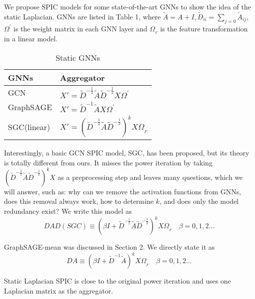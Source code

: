 \documentclass[preprint,11pt]{elsarticle}
\begin{document}
We propose SPIC models for some state-of-the-art GNNs to show the idea of the static Laplacian. GNNs are listed in Table 1, where $\widetilde{A}=A+I, \widetilde{D}_{ii}= \sum_{j=0}\widetilde{A}_{ij}$, $\Omega^{'}$ is the weight matrix in each GNN layer and $\Omega_{_F}$ is the feature transformation in a linear model.
\begin{table}
 \setlength{\abovecaptionskip}{0pt}
\setlength{\belowcaptionskip}{6pt}
  \caption{Static GNNs}
  \label{table-1}
  \centering
  \begin{tabular}{ll}
    \toprule 
    GNNs     & Aggregator  \\
    \midrule
    GCN  \cite{ref17} & $X' = \widetilde{D}^{-\frac{1}{2}}\widetilde{A} \widetilde{D}^{-\frac{1}{2}}X\Omega^{'}$ \\
    GraphSAGE  \cite{ref18}     & $X' = \widetilde{D}^{-1}\widetilde{A} X\Omega^{'}$  \\
    SGC(linear)  \cite{ref10}     & $X' = (\widetilde{D}^{-\frac{1}{2}}\widetilde{A} \widetilde{D}^{-\frac{1}{2}})^k X\Omega_{_F}$   \\
    \bottomrule
  \end{tabular}
\end{table}
Interestingly, a basic GCN SPIC model, SGC, has been proposed, but its theory is totally different from ours. It misses the power iteration by taking $ (\widetilde{D}^{-\frac{1}{2}}\widetilde{A} \widetilde{D}^{-\frac{1}{2}})^k X$ as a preprocessing step and leaves many questions, which we will answer, such as: why can we remove the activation functions from GNNs, does this removal always work, how to determine $k$, and does only the model redundancy exist? We write this model as
\begin{equation}
DAD(SGC) \equiv (\beta I + \widetilde{D}^{-\frac{1}{2}}\widetilde{A} \widetilde{D}^{-\frac{1}{2}})^k 	X\Omega_{_F} \quad \beta = 0,1,2... 
\end{equation}

GraphSAGE-mean was discussed in Section 2. We directly state it as
\begin{equation}
DA\equiv (\beta I + \widetilde{D}^{-1}\widetilde{A})^k X\Omega_{_F} \quad \beta = 0,1,2... 
\end{equation}

Static Laplacian SPIC is close to the original power iteration and uses one Laplacian matrix as the aggregator.
\end{document}
